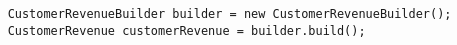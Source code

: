 \begin{verbatim}
    CustomerRevenueBuilder builder = new CustomerRevenueBuilder();
    CustomerRevenue customerRevenue = builder.build();
\end{verbatim}